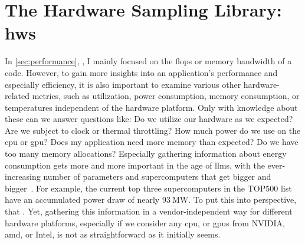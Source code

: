 \chapter{The Hardware Sampling Library: hws}
\label{chapter:hws}

In \autoref{sec:performance}, , I mainly focused on the \acrfull{flops} or memory bandwidth of a code. 
However, to gain more insights into an application's performance and especially efficiency, it is also important to examine various other hardware-related metrics, such as utilization, power consumption, memory consumption, or temperatures independent of the hardware platform. 
Only with knowledge about these can we answer questions like: Do we utilize our hardware as we expected? Are we subject to clock or thermal throttling? How much power do we use on the \gls{cpu} or \gls{gpu}? Does my application need more memory than expected? Do we have too many memory allocations? 
Especially gathering information about energy consumption gets more and more important in the age of \glspl{llm}, with the ever-increasing number of parameters and supercomputers that get bigger and bigger~\cite{de_vries_growing_2023, luccioni_estimating_2023}. 
For example, the current top three supercomputers in the TOP500 list~\cite{top500org_november_2024} have an accumulated power draw of nearly $\SI{93}{\mega\watt}$. 
To put this into perspective, that .
Yet, gathering this information in a vendor-independent way for different hardware platforms, especially if we consider any \gls{cpu}, or \glspl{gpu} from NVIDIA, \gls{amd}, or Intel, is not as straightforward as it initially seems. 

